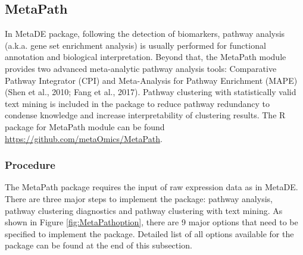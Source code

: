 \subsection{MetaPath}

In MetaDE package,
following the detection of biomarkers, pathway analysis (a.k.a. gene set enrichment analysis) is usually performed for functional annotation and biological interpretation. 
Beyond that, the MetaPath module provides two advanced meta-analytic pathway analysis tools: 
Comparative Pathway Integrator (CPI) and Meta-Analysis for Pathway Enrichment (MAPE) (Shen et al., 2010; Fang et al., 2017). 
Pathway clustering with statistically valid text mining is included in the package to reduce pathway redundancy to condense knowledge and increase interpretability of clustering results. 
The R package for MetaPath module can be found \url{https://github.com/metaOmics/MetaPath}.

\subsubsection{Procedure}
The MetaPath package requires the input of raw expression data as in MetaDE. 
There are three major steps to implement the package: pathway analysis, pathway clustering diagnostics and pathway clustering with text mining. 
As shown in Figure \ref{fig:MetaPathoption}, there are 9 major options that need to be specified to implement the package.
Detailed list of all options available for the package can be found at the end of this subsection. 


